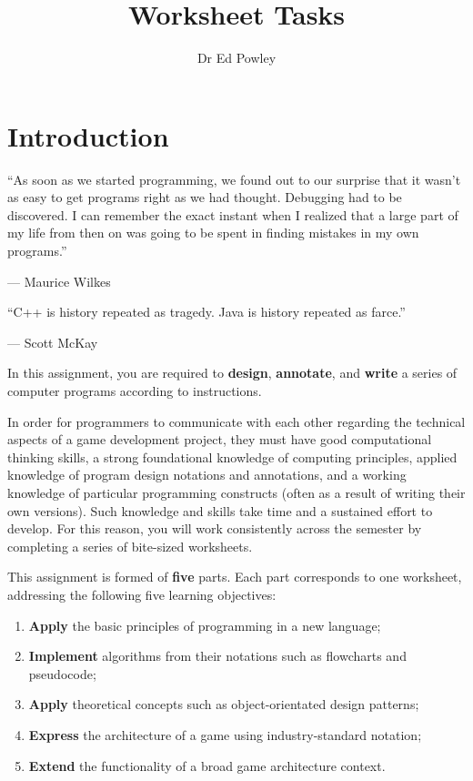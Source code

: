\documentclass{../fal_assignment}
\title{Worksheet Tasks}
\author{Dr Ed Powley}
\begin{document}
\maketitle

\section*{Introduction}

\begin{marginquote}
``As soon as we started programming, we found out to our surprise that it wasn't as easy to get programs right as we had thought. Debugging had to be discovered. I can remember the exact instant when I realized that a large part of my life from then on was going to be spent in finding mistakes in my own programs.''
\par --- Maurice Wilkes
\marginquoterule
\par ``C++ is history repeated as tragedy. Java is history repeated as farce.''
\par --- Scott McKay
\end{marginquote}

In this assignment, you are required to \textbf{design}, \textbf{annotate}, and \textbf{write} a series of computer programs according to instructions.

In order for programmers to communicate with each other regarding the technical aspects of a game development project, they must have good computational thinking skills, a strong foundational knowledge of computing principles, applied knowledge of program design notations and annotations, and a working knowledge of particular programming constructs (often as a result of writing their own versions). Such knowledge and skills take time and a sustained effort to develop. For this reason, you will work consistently across the semester by completing a series of bite-sized worksheets.

This assignment is formed of \textbf{five} parts.
Each part corresponds to one worksheet, addressing the following five learning objectives:
\begin{enumerate}[label=(\Alph*)]
	\item \textbf{Apply} the basic principles of programming in a new language;
	\item \textbf{Implement} algorithms from their notations such as flowcharts and pseudocode;
	\item \textbf{Apply} theoretical concepts such as object-orientated design patterns;
	\item \textbf{Express} the architecture of a game using industry-standard notation;
	\item \textbf{Extend} the functionality of a broad game architecture context.
\end{enumerate}
\end{document}
